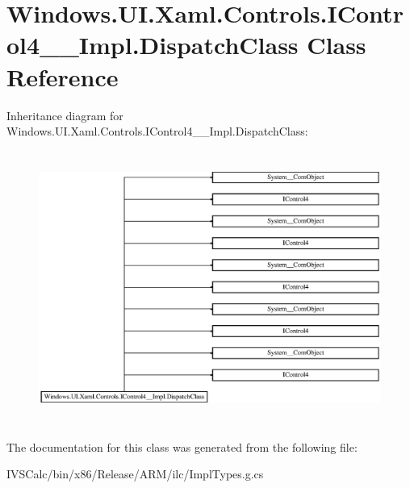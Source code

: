 \hypertarget{class_windows_1_1_u_i_1_1_xaml_1_1_controls_1_1_i_control4_____impl_1_1_dispatch_class}{}\section{Windows.\+U\+I.\+Xaml.\+Controls.\+I\+Control4\+\_\+\+\_\+\+Impl.\+Dispatch\+Class Class Reference}
\label{class_windows_1_1_u_i_1_1_xaml_1_1_controls_1_1_i_control4_____impl_1_1_dispatch_class}
Inheritance diagram for Windows.\+U\+I.\+Xaml.\+Controls.\+I\+Control4\+\_\+\+\_\+\+Impl.\+Dispatch\+Class\+:\begin{figure}[H]
\begin{center}
\leavevmode
\includegraphics[height=8.979592cm]{class_windows_1_1_u_i_1_1_xaml_1_1_controls_1_1_i_control4_____impl_1_1_dispatch_class}
\end{center}
\end{figure}


The documentation for this class was generated from the following file\+:\begin{DoxyCompactItemize}
\item 
I\+V\+S\+Calc/bin/x86/\+Release/\+A\+R\+M/ilc/Impl\+Types.\+g.\+cs\end{DoxyCompactItemize}
